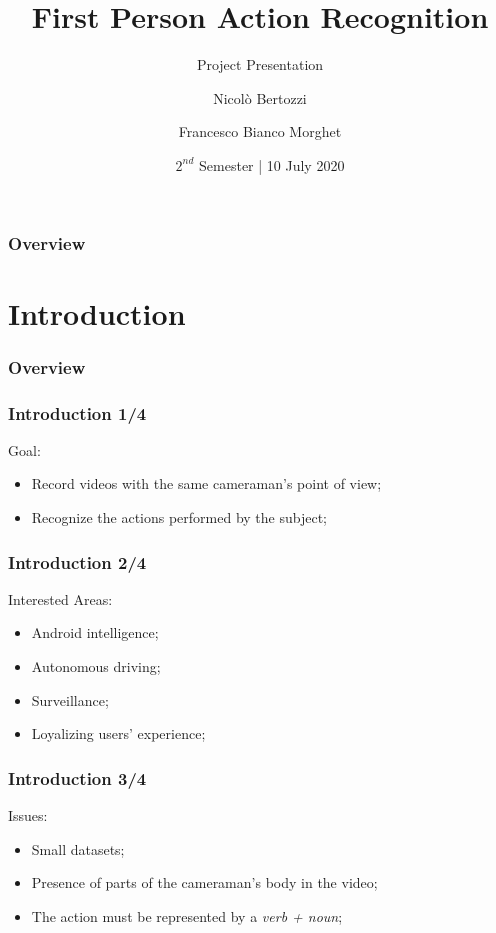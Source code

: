 \documentclass{beamer}
\title{\textbf{First Person Action Recognition}} %
\subtitle{Project Presentation}
\author{Nicolò Bertozzi \and Francesco Bianco Morghet} %
\institute[Politecnico di Torino] %
{
\medskip
\large \textbf{Machine Learning and Deep Learning}
}
\date{$2^{nd}$ Semester | 10 July 2020} %
\begin{document}
\begin{frame}
\titlepage 
\end{frame}

\begin{frame}
\frametitle{Overview} 
\tableofcontents
\end{frame}

\section{Introduction}

\begin{frame}
\frametitle{Overview} 
  \tableofcontents[currentsection]
\end{frame}

\begin{frame}
\frametitle{Introduction 1/4}
Goal:
\begin{itemize}
\item Record videos with the same cameraman's point of view;
\item Recognize the actions performed by the subject;
\end{itemize}
\end{frame}

\begin{frame}
\frametitle{Introduction 2/4}
Interested Areas:
\begin{itemize}
\item Android intelligence;
\item Autonomous driving;
\item Surveillance;
\item Loyalizing users' experience;
\end{itemize}
\end{frame}

\begin{frame}
\frametitle{Introduction 3/4}
Issues:
\begin{itemize}
\item Small datasets;
\item Presence of parts of the cameraman's body in the video;
\item The action must be represented by a \emph{verb + noun};
\end{itemize}
\end{frame}
\end{document}

